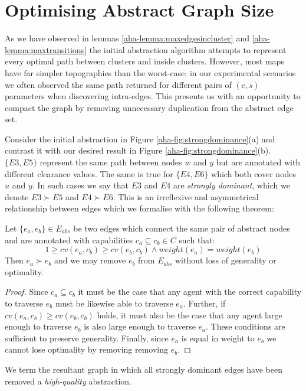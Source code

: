 \section{Optimising Abstract Graph Size}
\par \indent
As we have observed in lemmas \ref{aha-lemma:maxedgesincluster} and \ref{aha-lemma:maxtransitions} the initial abstraction algorithm attempts to represent every optimal path between clusters and inside clusters.
However, most maps have far simpler topographies than the worst-case; in our  experimental scenarios we often observed the same path returned for different pairs of $(c, s)$ parameters when discovering intra-edges.
This presents us with an opportunity to compact the graph by removing unnecessary duplication from the abstract edge set. 
\par \indent
Consider the initial abstraction in Figure \ref{aha-fig:strongdominance}(a) and contrast it with our desired result in Figure \ref{aha-fig:strongdominance}(b). 
$\lbrace E3, E5 \rbrace$ represent the same path between nodes $w$ and $y$ but are annotated with different clearance values. 
The same is true  for $\lbrace E4, E6 \rbrace$ which both cover nodes $u$ and $y$. 
In such cases we say that $E3$ and $E4$ are \emph{strongly dominant}, which we denote $E3 \succ E5$ and $E4 \succ E6$. 
This is an irreflexive and asymmetrical relationship between edges which we formalise with the following theorem: 
\begin{theorem}
\label{aha-theorem:strongdominance}
Let $\lbrace e_{a}, e_{b} \rbrace \in E_{abs}$ be two edges which connect the same pair of abstract nodes and are annotated with capabilities $c_{a} \subseteq c_{b} \in C$ such that: 
$$ 1 \geq cv(e_{a}, c_{b}) \geq cv(e_{b}, c_{b}) \wedge weight(e_{a}) = weight(e_{b})$$
Then $e_{a} \succ e_{b}$ and we may remove $e_{b}$ from $E_{abs}$ without loss of generality or optimality.
\end{theorem}
\begin{proof}
Since $c_{a} \subseteq c_{b}$ it must be the case that any agent with the correct capability to traverse $e_{b}$ must be likewise able to traverse $e_{a}$.
Further, if $cv(e_{a}, c_{b}) \geq cv(e_{b}, c_{b})$ holds, it must also be the case that any agent large enough to traverse $e_{b}$ is also large enough to traverse $e_{a}$.
These conditions are sufficient to preserve generality.
Finally, since $e_{a}$ is equal in weight to $e_{b}$ we cannot lose optimality by removing removing $e_{b}$.
\end{proof}
We term the resultant graph in which all strongly dominant edges have been removed a \emph{high-quality} abstraction.  

